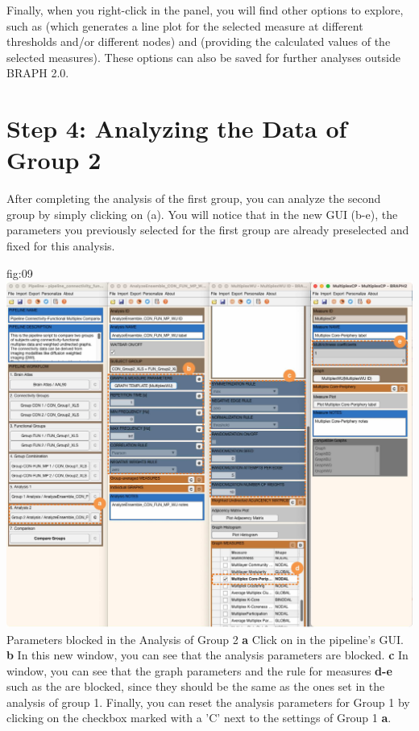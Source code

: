 \documentclass[justified]{tufte-handout}
\begin{document}
Finally, when you right-click in the  panel, you will find other options to explore, such as  (which generates a line plot for the selected measure at different thresholds and/or different nodes) and  (providing the calculated values of the selected measures). These options can also be saved for further analyses outside BRAPH 2.0.

\section{Step 4: Analyzing the Data of Group 2}

After completing the analysis of the first group, you can analyze the second group by simply clicking on  (a). You will notice that in the new GUI (b-e), the parameters you previously selected for the first group are already preselected and fixed for this analysis. 

	{fig:09}
	{
	\includegraphics{fig09.jpg}
	}
	{Parameters blocked in the Analysis of Group 2}
	{
	{\bf a} Click on  in the pipeline's GUI. 
	{\bf b} In this new window, you can see that the analysis parameters are blocked.
	{\bf c} In  window, you can see that the graph parameters and the rule for measures {\bf d-e} such as the  are blocked, since they should be the same as the ones set in the analysis of group 1. Finally, you can reset the analysis parameters for Group 1 by clicking on the checkbox marked with a 'C' next to the settings of Group 1 {\bf a}.
	}
	
\end{document}

